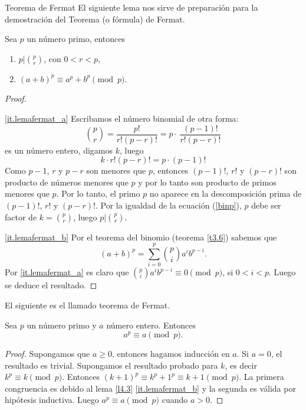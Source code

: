 \begin{section}{Teorema de Fermat}\label{seccion-teorema-de-fermat} 
El siguiente lema nos sirve de preparación para la demostración
del Teorema (o fórmula) de Fermat.

\begin{lema} \label{l4.3} Sea $p$ un número primo, entonces
\begin{enumerate}[label=\textit{\alph*)}]
\item\label{it.lemafermat_a}  $p|\displaystyle\binom{p}{r}$, con $0< r <p$,
\item\label{it.lemafermat_b}  $(a+b)^p \equiv a^p+b^p \pmod{p}$.
\end{enumerate}
\end{lema}
\begin{proof}
    \
    
    \ref{it.lemafermat_a} Escribamos el número binomial de otra forma: 
$$
\binom{p}{r}=\frac{p!}{r!(p-r)!}=p\cdot\,\frac{(p-1)!}{r!(p-r)!}
$$ 
es un número entero, digamos $k$, luego 
\begin{equation}\label{binp}
k \cdot r!(p-r)! = p \cdot(p-1)!
\end{equation}
Como $p-1$, $r$ y $p-r$ son menores que $p$, entonces  $(p-1)!$, $r!$ y $(p-r)!$ son producto de números menores que $p$ y por lo tanto son producto de primos menores que $p$. 
Por lo tanto, el primo $p$ no aparece en la descomposición prima de $(p-1)!$, $r!$ y $(p-r)!$. Por la igualdad de la ecuación (\ref{binp}), $p$ debe ser factor de $k = \binom{p}{r}$, luego $p|\binom{p}{r}$.

\ref{it.lemafermat_b} Por el teorema del binomio (teorema \ref{t3.6}) sabemos que
$$
(a+b)^p =\sum_{i=0}^{p} \binom{p}{i} a^ib^{p-i}.
$$
Por \ref{it.lemafermat_a} es claro que $ \binom{p}{i} a^ib^{p-i}\equiv 0 \pmod{p}$,
si $0<i<p$. Luego se deduce el resultado.
\end{proof}

El siguiente es el llamado teorema de Fermat.

\begin{teorema}\label{t4.3} Sea $p$ un número primo y $a$ número
entero. Entonces
$$
a^p\equiv a\pmod{p}.
$$
\end{teorema}
\begin{proof} Supongamos que $a\ge 0$, entonces hagamos
inducción en $a$. Si $a=0$, el resultado es trivial. Supongamos el
resultado probado para $k$, es decir $k^p \equiv k \pmod{p}$.
Entonces $(k+1)^p \equiv k^p +1^p \equiv k+1 \pmod{p}$. La primera
congruencia es debido al lema \ref{l4.3} \ref{it.lemafermat_b} y la segunda es
válida por hipótesis inductiva. Luego $a^p\equiv a\pmod{p}$ cuando $a >0$.


\end{proof}
\end{section}
